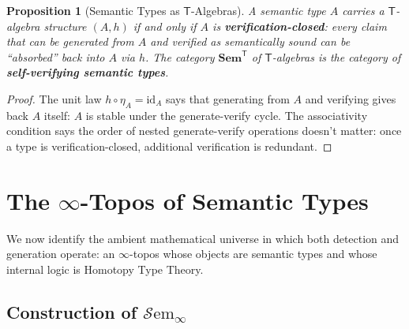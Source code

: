\documentclass[11pt,a4paper]{article}
\theoremstyle{plain}
\newtheorem{proposition}[theorem]{Proposition}
\theoremstyle{definition}
\theoremstyle{remark}
\newcommand{\Sem}{\mathbf{Sem}}
\newcommand{\id}{\mathrm{id}}
\newcommand{\SemanticT}{\mathsf{T}}
\begin{document}
\begin{proposition}[Semantic Types as $\SemanticT$-Algebras]\label{prop:t-algebra-semantics}
A semantic type $A$ carries a $\SemanticT$-algebra structure $(A, h)$ if and only if $A$ is \textbf{verification-closed}: every claim that can be generated from $A$ and verified as semantically sound can be ``absorbed'' back into $A$ via $h$. The category $\Sem^{\SemanticT}$ of $\SemanticT$-algebras is the category of \textbf{self-verifying semantic types}.
\end{proposition}

\begin{proof}
The unit law $h \circ \eta_A = \id_A$ says that generating from $A$ and verifying gives back $A$ itself: $A$ is stable under the generate-verify cycle. The associativity condition says the order of nested generate-verify operations doesn't matter: once a type is verification-closed, additional verification is redundant.
\end{proof}


\section{The \texorpdfstring{$\infty$}{Infinity}-Topos of Semantic Types}\label{sec:topos}

We now identify the ambient mathematical universe in which both detection and generation operate: an $\infty$-topos whose objects are semantic types and whose internal logic is Homotopy Type Theory.

\subsection{Construction of \texorpdfstring{$\mathcal{S}\mathrm{em}_\infty$}{Sem-infinity}}
\end{document}
